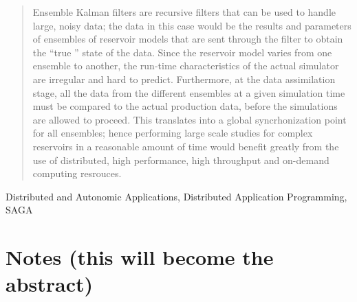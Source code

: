 \documentclass[conference,draft]{IEEEtran}
\begin{document}
\begin{abstract}
Ensemble Kalman filters are recursive filters that can be used to handle large, noisy 
data; the data in this case would be the results and parameters of ensembles of reservoir 
models that are sent through the filter to obtain the ``true '' state of the data. Since 
the reservoir model varies from one ensemble to another, the run-time characteristics of 
the actual simulator are irregular and hard to predict. Furthermore, at the data 
assimilation stage, all the data from the different ensembles at a given simulation time 
must be compared to the actual production data, before the simulations are allowed to 
proceed. This translates into a global syncrhonization point for all ensembles;
hence performing large scale studies for complex reservoirs in a reasonable amount of time 
would benefit greatly from the use of distributed, high performance, high throughput and
on-demand computing resrouces.







\end{abstract}

\begin{keywords}
    Distributed and Autonomic Applications, Distributed Application
    Programming, SAGA
  \end{keywords}

\section*{Notes (this will become the abstract)}
\end{document}
